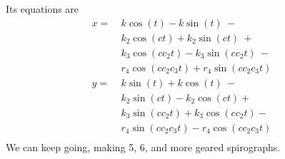 \documentclass{article}
\begin{document}
Its equations are
\begin{align*}
    x = &\ k\cos\left(t\right)-k\sin\left(t\right)\ -\\
        &\ k_{2}\cos\left(ct\right)+k_{2}\sin\left(ct\right)\ +\\
        &\ k_{3}\cos\left(cc_{2}t\right) - k_{3}\sin\left(cc_{2}t\right)\ -\\
        &\ r_{4}\cos\left(cc_{2}c_{3}t\right)+r_{4}\sin\left(cc_{2}c_{3}t\right) \\
    y = &\ k\sin\left(t\right)+k\cos\left(t\right)\ -\\
        &\ k_{2}\sin\left(ct\right) - k_{2}\cos\left(ct\right) +\\
        &\ k_{3}\sin\left(cc_{2}t\right) + k_{3}\cos\left(cc_{2}t\right)-& \\
        &\ r_{4}\sin\left(cc_{2}c_{3}t\right)-r_{4}\cos\left(cc_{2}c_{3}t\right) \\
\end{align*}
We can keep going, making 5, 6, and more geared spirographs.
\end{document}
